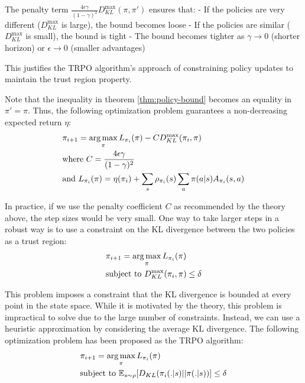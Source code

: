 The penalty term $\frac{4\epsilon\gamma}{(1-\gamma)^2}D_{KL}^{\max}(\pi, \pi')$ ensures that:
- If the policies are very different ($D_{KL}^{\max}$ is large), the bound becomes loose
- If the policies are similar ($D_{KL}^{\max}$ is small), the bound is tight
- The bound becomes tighter as $\gamma \to 0$ (shorter horizon) or $\epsilon \to 0$ (smaller advantages)

This justifies the TRPO algorithm's approach of constraining policy updates to maintain the trust region property.


Note that the inequality in theorem \ref{thm:policy-bound} becomes an equality in $\pi' = \pi$. Thus, the following optimization problem guarantees a non-decreasing expected return $\eta$:
\begin{align*}
    &\pi_{i + 1} = \operatorname*{arg\,max}_{\pi} L_{\pi_i}(\pi) - CD_{KL}^{\max}(\pi_i, \pi)\\
    &\text{where } C = \frac{4\epsilon\gamma}{(1-\gamma)^2}\\
    &\text{and } L_{\pi_i}(\pi) = \eta(\pi_i) + \sum_{s}\rho_{\pi_i}(s)\sum_{a}\pi(a|s)A_{\pi_i}(s, a)
\end{align*}

In practice, if we use the penalty coefficient $C$ as recommended by the theory above, the step sizes would be very small. One way to take larger steps in a robust way is to use a constraint on the KL divergence between the two policies as a trust region:
\begin{align*}
    &\pi_{i + 1} = \operatorname*{arg\,max}_{\pi} L_{\pi_i}(\pi)\\
    &\text{subject to } D_{KL}^{\max}(\pi_i, \pi) \le \delta
\end{align*}

This problem imposes a constraint that the KL divergence is bounded at every point in the state space. While it is motivated by the theory, this problem is impractical to solve due to the large number of constraints. Instead, we can use a heuristic approximation by considering the average KL divergence. The following optimization problem has been proposed as the TRPO algorithm:
\begin{align*}
    &\pi_{i + 1} = \operatorname*{arg\,max}_{\pi} L_{\pi_i}(\pi)\\
    &\text{subject to } \mathbb{E}_{s \sim \rho}[D_{KL}(\pi_i (.|s) || \pi(.|s))] \le \delta
\end{align*}